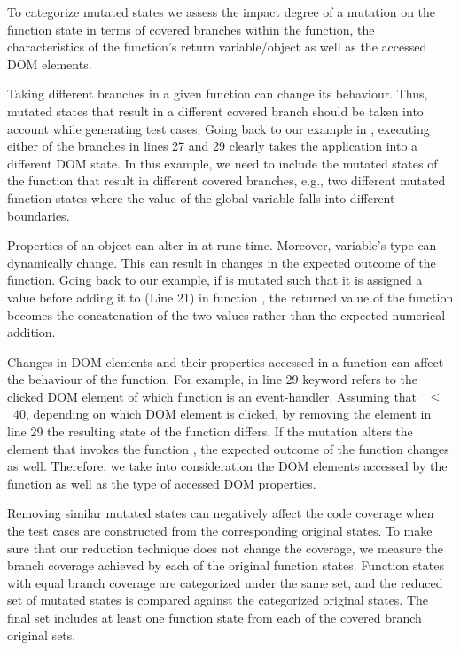 

To categorize mutated states we assess the impact degree of a mutation on the function state in terms of covered branches within the function, the characteristics of the function's return variable/object as well as the accessed DOM elements.
\begin{description}[noitemsep, leftmargin=0.4cm]
\item[Branch coverage:] Taking different branches in a given function can change its behaviour. Thus, mutated states that result in a different covered branch should be taken into account while generating test cases. Going back to our example in , executing either of the branches in lines 27 and 29 clearly takes the application into a different DOM state. In this example, we need to include the  mutated states of the  function that result in different covered branches, e.g., two different mutated function states where the value of the 
global variable  falls into different boundaries. 
\item[Return variable/object characteristics:] Properties of an object can alter in \javascript at rune-time. Moreover, variable's type can dynamically change. This can result in changes in the expected outcome of the function. Going back to our example, if  is mutated such that it is assigned a  value before adding it to  (Line 21) in function , the returned value of the function becomes the  concatenation of the two values rather than the expected numerical addition. 
\item[Accessed DOM properties:] Changes in DOM elements and their properties accessed in a function can affect the behaviour of the function. For example, in line 29  keyword refers to the clicked DOM element of which function  is an event-handler. Assuming that ~$\leq$~40, depending on which DOM element is clicked, by removing the element in line 29 the resulting state of the function  differs. If the mutation alters the element that invokes the function , the expected outcome of the function changes as well. 
Therefore, we take into consideration the DOM elements accessed by the function as well as the type of accessed DOM properties.
\end{description}

Removing similar mutated states can negatively affect the code coverage when the test cases are constructed from the corresponding original states. To make sure that our reduction technique does not change the coverage, we measure the branch coverage achieved by each of the original function states. Function states with equal branch coverage are categorized under the same set, and the reduced set of mutated states is compared against the categorized original states. The final set includes at least one function state from each of the covered branch original sets.

